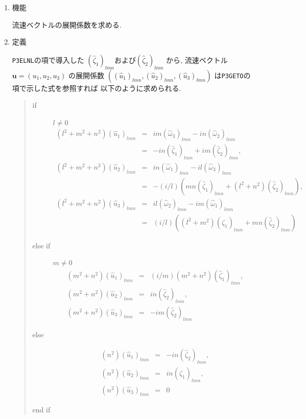 \documentclass[a4j,fleqn]{jarticle}
\begin{document}
\begin{enumerate}

\item 機能

流速ベクトルの展開係数を求める.

\item 定義

{\tt P3ELNL}の項で導入した
$(\hat{\zeta}_1)_{lmn}$および$(\hat{\zeta}_2)_{lmn}$
から, 流速ベクトル$\boldsymbol{u}=(u_1,u_2,u_3)$
の展開係数
$((\hat{u}_1)_{lmn},(\hat{u}_2)_{lmn},(\hat{u}_3)_{lmn})$
は{\tt P3GETO}の項で示した式を参照すれば
以下のように求められる.
\begin{quote}
\begin{description}
\item[if] $l\neq 0$
\begin{eqnarray*}
(l^2+m^2+n^2)(\hat{u}_1)_{lmn}&=&
im(\hat{\omega}_3)_{lmn}-in(\hat{\omega}_2)_{lmn}\\
&=& -in(\hat{\zeta}_1)_{lmn}+im(\hat{\zeta}_2)_{lmn},\\
(l^2+m^2+n^2)(\hat{u}_2)_{lmn}&=&
in(\hat{\omega}_1)_{lmn}-il(\hat{\omega}_3)_{lmn}\\
&=&-(i/l)(mn(\hat{\zeta}_1)_{lmn}
                         +(l^2+n^2)(\hat{\zeta}_2)_{lmn}),\\
(l^2+m^2+n^2)(\hat{u}_3)_{lmn}&=&
il(\hat{\omega}_2)_{lmn}-im(\hat{\omega}_1)_{lmn}\\
&=&(i/l)((l^2+m^2)(\hat{\zeta}_1)_{lmn}
                         +mn(\hat{\zeta}_2)_{lmn})
\end{eqnarray*}
\item[else if] $m\neq 0$
\begin{eqnarray*}
(m^2+n^2)(\hat{u}_1)_{lmn}&=&(i/m)(m^2+n^2)(\hat{\zeta}_1)_{lmn},\\
(m^2+n^2)(\hat{u}_2)_{lmn}&=&in(\hat{\zeta}_2)_{lmn},\\
(m^2+n^2)(\hat{u}_3)_{lmn}&=&-im(\hat{\zeta}_2)_{lmn}
\end{eqnarray*}
\item[else] 
\begin{eqnarray*}
(n^2)(\hat{u}_1)_{lmn}&=&-in(\hat{\zeta}_2)_{lmn},\\
(n^2)(\hat{u}_2)_{lmn}&=&in(\hat{\zeta}_1)_{lmn},\\
(n^2)(\hat{u}_3)_{lmn}&=&0
\end{eqnarray*}

\item[end if]

\end{description}
\end{quote}


\end{enumerate}
\end{document}
